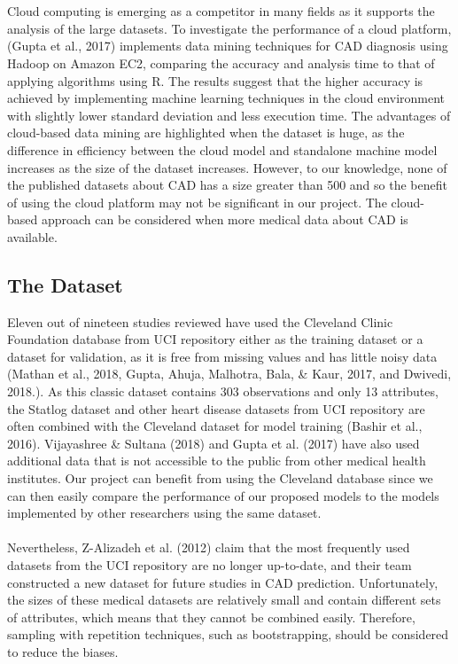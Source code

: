 \documentclass[a4paper, 12pt]{article}
\begin{document}
    \\\\
    Cloud computing is emerging as a competitor in many fields as it supports the analysis of the large datasets. To investigate the performance of a cloud platform, (Gupta et al., 2017) implements data mining techniques for CAD diagnosis using Hadoop on Amazon EC2, comparing the accuracy and analysis time to that of applying algorithms using R. The results suggest that the higher accuracy is achieved by implementing machine learning techniques in the cloud environment with slightly lower standard deviation and less execution time. The advantages of cloud-based data mining are highlighted when the dataset is huge, as the difference in efficiency between the cloud model and standalone machine model increases as the size of the dataset increases. However, to our knowledge, none of the published datasets about CAD has a size greater than 500 and so the benefit of using the cloud platform may not be significant in our project. The cloud-based approach can be considered when more medical data about CAD is available.
    
    \subsection{The Dataset}
    Eleven out of nineteen studies reviewed have used the Cleveland Clinic Foundation database from UCI repository either as the training dataset or a dataset for validation, as it is free from missing values and has little noisy data (Mathan et al., 2018, Gupta, Ahuja, Malhotra, Bala, \& Kaur, 2017, and Dwivedi, 2018.). As this classic dataset contains 303 observations and only 13 attributes, the Statlog dataset and other heart disease datasets from UCI repository are often combined with the Cleveland dataset for model training (Bashir et al., 2016). Vijayashree \& Sultana (2018) and Gupta et al. (2017) have also used additional data that is not accessible to the public from other medical health institutes. Our project can benefit from using the Cleveland database since we can then easily compare the performance of our proposed models to the models implemented by other researchers using the same dataset. 
    \\\\
    Nevertheless, Z-Alizadeh et al. (2012) claim that the most frequently used datasets from the UCI repository are no longer up-to-date, and their team constructed a new dataset for future studies in CAD prediction. Unfortunately, the sizes of these medical datasets are relatively small and contain different sets of attributes, which means that they cannot be combined easily. Therefore, sampling with repetition techniques, such as bootstrapping, should be considered to reduce the biases. \\\\
    
\end{document}
